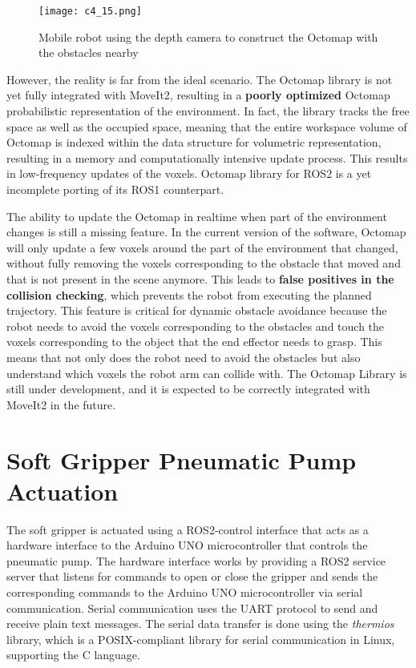 \begin{figure}[t]
    \centering
    \texttt{[image: c4\_15.png]}
    \caption{Mobile robot using the depth camera to construct the Octomap with the obstacles nearby}
    \label{fig:octomap}
\end{figure}

However, the reality is far from the ideal scenario. The Octomap library is not yet fully integrated with MoveIt2,
resulting in a \textbf{poorly optimized} Octomap probabilistic representation of the environment.
In fact, the library tracks the free space as well as the occupied space, meaning that the entire workspace volume
of Octomap is indexed within the data structure for volumetric representation, resulting in a memory and computationally
intensive update process. This results in low-frequency updates of the voxels. Octomap
library for ROS2 is a yet incomplete porting of its ROS1 counterpart.

The ability to update the Octomap in realtime when part of the environment changes is still a missing feature.
In the current version of the software, Octomap will only update a few voxels around the
part of the environment that changed, without fully removing the voxels corresponding to the obstacle that moved
and that is not present in the scene anymore. This leads to \textbf{false positives in the collision checking}, which
prevents the robot from executing the planned trajectory. This feature is critical for dynamic obstacle avoidance
because the robot needs to avoid the voxels corresponding to the obstacles and touch the voxels corresponding
to the object that the end effector needs to grasp. This means that not only does the robot need to avoid the obstacles
but also understand which voxels the robot arm can collide with.
The Octomap Library is still under development, and it is expected to be correctly integrated with MoveIt2 in the future.

\section{Soft Gripper Pneumatic Pump Actuation}

The soft gripper is actuated using a ROS2-control interface that acts as a hardware interface to the Arduino UNO
microcontroller that controls the pneumatic pump. The hardware interface works by providing a ROS2 service server that 
listens for commands to open or close the gripper and sends the corresponding commands to the Arduino UNO microcontroller
via serial communication. 
Serial communication uses the UART protocol to send and receive plain text messages.
The serial data transfer is done using the \textit{thermios} library, which is a POSIX-compliant library for serial
communication in Linux, supporting the C language.

